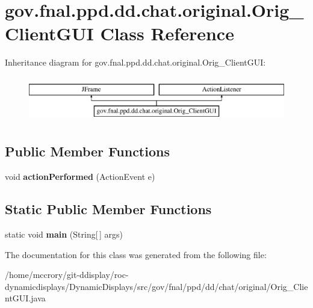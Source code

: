 \hypertarget{classgov_1_1fnal_1_1ppd_1_1dd_1_1chat_1_1original_1_1Orig__ClientGUI}{\section{gov.\-fnal.\-ppd.\-dd.\-chat.\-original.\-Orig\-\_\-\-Client\-G\-U\-I Class Reference}
\label{classgov_1_1fnal_1_1ppd_1_1dd_1_1chat_1_1original_1_1Orig__ClientGUI}
}
Inheritance diagram for gov.\-fnal.\-ppd.\-dd.\-chat.\-original.\-Orig\-\_\-\-Client\-G\-U\-I\-:\begin{figure}[H]
\begin{center}
\leavevmode
\includegraphics[height=2.000000cm]{classgov_1_1fnal_1_1ppd_1_1dd_1_1chat_1_1original_1_1Orig__ClientGUI}
\end{center}
\end{figure}
\subsection*{Public Member Functions}
\begin{DoxyCompactItemize}
\item 
\hypertarget{classgov_1_1fnal_1_1ppd_1_1dd_1_1chat_1_1original_1_1Orig__ClientGUI_af28354769c07959b7c6fd4332a95d672}{void {\bfseries action\-Performed} (Action\-Event e)}\label{classgov_1_1fnal_1_1ppd_1_1dd_1_1chat_1_1original_1_1Orig__ClientGUI_af28354769c07959b7c6fd4332a95d672}

\end{DoxyCompactItemize}
\subsection*{Static Public Member Functions}
\begin{DoxyCompactItemize}
\item 
\hypertarget{classgov_1_1fnal_1_1ppd_1_1dd_1_1chat_1_1original_1_1Orig__ClientGUI_ad9e39c48ddafa96c84ef8285bbe6ef24}{static void {\bfseries main} (String\mbox{[}$\,$\mbox{]} args)}\label{classgov_1_1fnal_1_1ppd_1_1dd_1_1chat_1_1original_1_1Orig__ClientGUI_ad9e39c48ddafa96c84ef8285bbe6ef24}

\end{DoxyCompactItemize}


The documentation for this class was generated from the following file\-:\begin{DoxyCompactItemize}
\item 
/home/mccrory/git-\/ddisplay/roc-\/dynamicdisplays/\-Dynamic\-Displays/src/gov/fnal/ppd/dd/chat/original/Orig\-\_\-\-Client\-G\-U\-I.\-java\end{DoxyCompactItemize}
